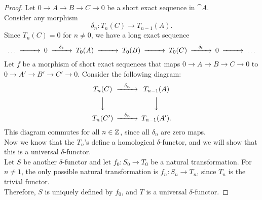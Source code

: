 \begin{proof}
	Let $0 \rightarrow A \rightarrow B \rightarrow C \rightarrow 0$ be a short exact sequence in $\cat{A}$. \\
	Consider any morphism $$\delta_n:T_n(C)\rightarrow T_{n-1}(A).$$
	Since $T_n(C)=0$ for $n\neq0$, we have a long exact sequence
	\begin{align*}
		\begin{CD}
			\dots @>>> 0 @>\delta_1>> T_0(A) @>>> T_0(B) @>>> T_0(C) @>\delta_0>> 0 @>>> \dots
		\end{CD}
	\end{align*}
	Let $f$ be a morphism of short exact sequences that maps $0 \rightarrow A \rightarrow B \rightarrow C \rightarrow 0$ to $0 \rightarrow A' \rightarrow B' \rightarrow C' \rightarrow 0$. Consider the following diagram:
	\begin{align*}
		\begin{CD}
			T_n(C) @>\delta_n>> T_{n-1}(A) \\
			@VVV		@VVV \\
			T_n(C') @>\delta_n>> T_{n-1}(A').
		\end{CD}
	\end{align*}
	This diagram commutes for all $n\in{\mathbb Z}$, since all $\delta_n$ are zero maps. \\
	Now we know that the $T_n$'s define a homological $\delta$-functor, and we will show that this is a universal $\delta$-functor. \\
	Let $S$ be another $\delta$-functor and let $f_0:S_0\rightarrow T_0$ be a natural transformation.
	For $n\neq1$, the only possible natural transformation is $f_n:S_n\rightarrow T_n$, since $T_n$ is the trivial functor. \\
	Therefore, $S$ is uniquely defined by $f_0$, and $T$ is a universal $\delta$-functor.
\end{proof}